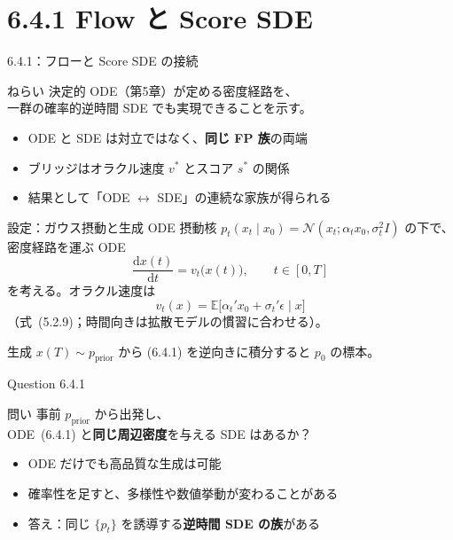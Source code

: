 \section{6.4.1 Flow と Score SDE}
\asmain
\begin{frame}{6.4.1：フローと Score SDE の接続}
    \begin{block}{ねらい}
        決定的 ODE（第5章）が定める密度経路を、\\
        一群の確率的逆時間 SDE でも実現できることを示す。
    \end{block}
    \begin{itemize}
        \item ODE と SDE は対立ではなく、\textbf{同じ FP 族}の両端
        \item ブリッジはオラクル速度 $v^{*}$ とスコア $s^{*}$ の関係
        \item 結果として「ODE $\leftrightarrow$ SDE」の連続な家族が得られる
    \end{itemize}
\end{frame}
\asmain
\begin{frame}{設定：ガウス摂動と生成 ODE}
    摂動核 $p_t(x_t\mid x_0)=\mathcal{N}(x_t;\alpha_t x_0,\sigma_t^{2}I)$ の下で、
    密度経路を運ぶ ODE
    \[
        \frac{\mathrm{d}x(t)}{\mathrm{d}t}
        =
        v_t\bigl(x(t)\bigr),
        \qquad
        t\in[0,T]
        \tag{6.4.1}
    \]
    を考える。オラクル速度は
    \[
        v_t(x)
        =
        \mathbb{E}\bigl[\alpha_t' x_0+\sigma_t'\epsilon\mid x\bigr]
    \]
    （式~(5.2.9)；時間向きは拡散モデルの慣習に合わせる）。
    \begin{exampleblock}{生成}
        $x(T)\sim p_{\mathrm{prior}}$ から (6.4.1) を逆向きに積分すると $p_0$ の標本。
    \end{exampleblock}
\end{frame}
\asmain
\begin{frame}{Question 6.4.1}
    \begin{block}{問い}
        事前 $p_{\mathrm{prior}}$ から出発し、\\
        ODE~(6.4.1) と\textbf{同じ周辺密度}を与える SDE はあるか？
    \end{block}
    \begin{itemize}
        \item ODE だけでも高品質な生成は可能
        \item 確率性を足すと、多様性や数値挙動が変わることがある
        \item 答え：同じ $\{p_t\}$ を誘導する\textbf{逆時間 SDE の族}がある
    \end{itemize}
\end{frame}
